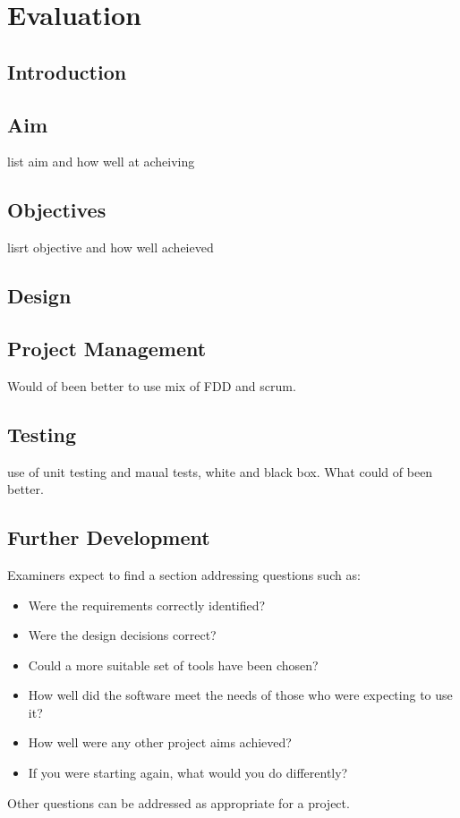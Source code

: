 \chapter{Evaluation}
\section{Introduction}
\section{Aim}
list aim and how well at acheiving
\section{Objectives}
lisrt objective and how well acheieved
\section{Design}

\section{Project Management}
Would of been better to use mix of FDD and scrum.
\section{Testing}
use of unit testing and maual tests, white and black box. What could of been better.
\section{Further Development}
Examiners expect to find a section addressing questions such as:

\begin{itemize}
   \item Were the requirements correctly identified? 
   \item Were the design decisions correct?
   \item Could a more suitable set of tools have been chosen?
   \item How well did the software meet the needs of those who were expecting to use it?
   \item How well were any other project aims achieved?
   \item If you were starting again, what would you do differently?
\end{itemize}

Other questions can be addressed as appropriate for a project. 


